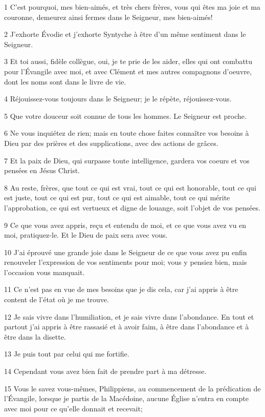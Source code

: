 \par 1 C'est pourquoi, mes bien-aimés, et très chers frères, vous qui êtes ma joie et ma couronne, demeurez ainsi fermes dans le Seigneur, mes bien-aimés!
\par 2 J'exhorte Évodie et j'exhorte Syntyche à être d'un même sentiment dans le Seigneur.
\par 3 Et toi aussi, fidèle collègue, oui, je te prie de les aider, elles qui ont combattu pour l'Évangile avec moi, et avec Clément et mes autres compagnons d'oeuvre, dont les noms sont dans le livre de vie.
\par 4 Réjouissez-vous toujours dans le Seigneur; je le répète, réjouissez-vous.
\par 5 Que votre douceur soit connue de tous les hommes. Le Seigneur est proche.
\par 6 Ne vous inquiétez de rien; mais en toute chose faites connaître vos besoins à Dieu par des prières et des supplications, avec des actions de grâces.
\par 7 Et la paix de Dieu, qui surpasse toute intelligence, gardera vos coeurs et vos pensées en Jésus Christ.
\par 8 Au reste, frères, que tout ce qui est vrai, tout ce qui est honorable, tout ce qui est juste, tout ce qui est pur, tout ce qui est aimable, tout ce qui mérite l'approbation, ce qui est vertueux et digne de louange, soit l'objet de vos pensées.
\par 9 Ce que vous avez appris, reçu et entendu de moi, et ce que vous avez vu en moi, pratiquez-le. Et le Dieu de paix sera avec vous.
\par 10 J'ai éprouvé une grande joie dans le Seigneur de ce que vous avez pu enfin renouveler l'expression de vos sentiments pour moi; vous y pensiez bien, mais l'occasion vous manquait.
\par 11 Ce n'est pas en vue de mes besoins que je dis cela, car j'ai appris à être content de l'état où je me trouve.
\par 12 Je sais vivre dans l'humiliation, et je sais vivre dans l'abondance. En tout et partout j'ai appris à être rassasié et à avoir faim, à être dans l'abondance et à être dans la disette.
\par 13 Je puis tout par celui qui me fortifie.
\par 14 Cependant vous avez bien fait de prendre part à ma détresse.
\par 15 Vous le savez vous-mêmes, Philippiens, au commencement de la prédication de l'Évangile, lorsque je partis de la Macédoine, aucune Église n'entra en compte avec moi pour ce qu'elle donnait et recevait;
